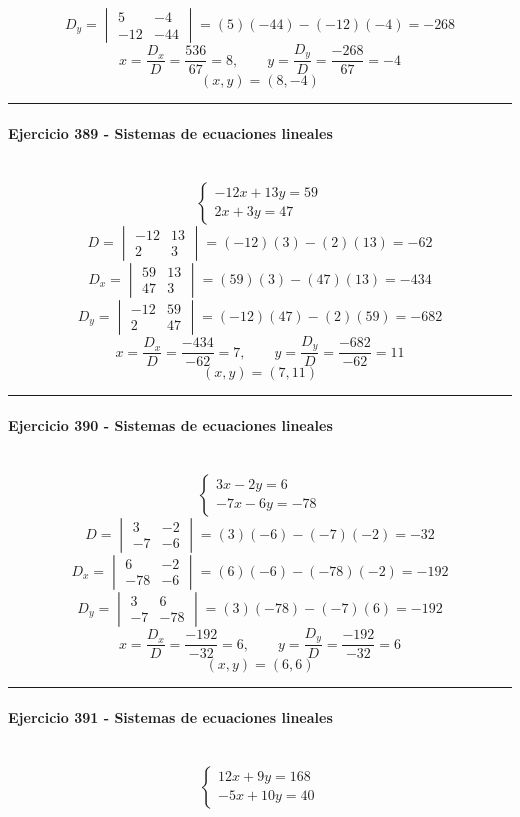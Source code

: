 \documentclass[10pt,a4paper]{article}
\newcommand{\res}[1]{\paragraph{#1}\mbox{}\\[-1.2em]}
\begin{document}
\[ D_y=\begin{vmatrix}5&-4\\-12&-44\end{vmatrix}=(5)(-44)-(-12)(-4)=-268 \]
\[ x=\frac{D_x}{D}=\frac{536}{67}=8,\qquad y=\frac{D_y}{D}=\frac{-268}{67}=-4 \]
\[ \boxed{(x,y)=(8,-4)} \]
\vspace{1mm}\hrule\vspace{2mm}
\res{Ejercicio 389 - Sistemas de ecuaciones lineales}
\[ \begin{cases}- 12 x + 13 y=59\\2 x + 3 y=47\end{cases} \]
\[ D=\begin{vmatrix}-12&13\\2&3\end{vmatrix}=(-12)(3)-(2)(13)=-62 \]
\[ D_x=\begin{vmatrix}59&13\\47&3\end{vmatrix}=(59)(3)-(47)(13)=-434 \]
\[ D_y=\begin{vmatrix}-12&59\\2&47\end{vmatrix}=(-12)(47)-(2)(59)=-682 \]
\[ x=\frac{D_x}{D}=\frac{-434}{-62}=7,\qquad y=\frac{D_y}{D}=\frac{-682}{-62}=11 \]
\[ \boxed{(x,y)=(7,11)} \]
\vspace{1mm}\hrule\vspace{2mm}
\res{Ejercicio 390 - Sistemas de ecuaciones lineales}
\[ \begin{cases}3 x - 2 y=6\\- 7 x - 6 y=-78\end{cases} \]
\[ D=\begin{vmatrix}3&-2\\-7&-6\end{vmatrix}=(3)(-6)-(-7)(-2)=-32 \]
\[ D_x=\begin{vmatrix}6&-2\\-78&-6\end{vmatrix}=(6)(-6)-(-78)(-2)=-192 \]
\[ D_y=\begin{vmatrix}3&6\\-7&-78\end{vmatrix}=(3)(-78)-(-7)(6)=-192 \]
\[ x=\frac{D_x}{D}=\frac{-192}{-32}=6,\qquad y=\frac{D_y}{D}=\frac{-192}{-32}=6 \]
\[ \boxed{(x,y)=(6,6)} \]
\vspace{1mm}\hrule\vspace{2mm}
\res{Ejercicio 391 - Sistemas de ecuaciones lineales}
\[ \begin{cases}12 x + 9 y=168\\- 5 x + 10 y=40\end{cases} \]
\end{document}
